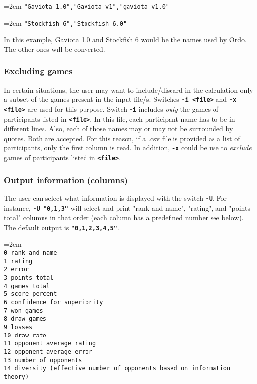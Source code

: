 \documentclass[12pt]{article}
\newcommand{\swtch} [1] {\texttt{\textbf{#1}}}
\newcommand{\cmdln}[1]{
	\par
	\begingroup
		\leftskip=2em
		\addtolength{\rightskip}{0em}
		\noindent \small{\texttt{#1}}
		\par
	\endgroup
}
\begin{document}
	\cmdln{"Gaviota 1.0","Gaviota v1","gaviota v1.0"}
	\cmdln{"Stockfish 6","Stockfish 6.0"}

In this example, Gaviota 1.0 and Stockfish 6 would be the names used by Ordo.
The other ones will be converted.

\subsubsection*{Excluding games}
In certain situations, the user may want to include/discard in the calculation only a subset of the games present in the input file/s.
Switches \swtch{-i <file>} and \swtch{-x <file>} are used for this purpose.
Switch \swtch{-i} includes \textit{only} the games of participants listed in \swtch{<file>}.
In this file, each participant name has to be in different lines. 
Also, each of those names may or may not be surrounded by quotes.
Both are accepted.
For this reason, if a .csv file is provided as a list of participants, only the first column is read.
In addition, \swtch{-x} could be use to \textit{exclude} games of participants listed in \swtch{<file>}.

\subsubsection*{Output information (columns)}
The user can select what information is displayed with the switch \swtch{-U}.
For instance, \swtch{-U "0,1,3"} will select and print "rank and name", "rating", and "points total" columns in that order (each column has a predefined number see below). 
The default output is \swtch{"0,1,2,3,4,5"}.

\cmdln{\\
 0 rank and name\\
 1 rating\\
 2 error\\
 3 points total\\
 4 games total\\
 5 score percent\\
 6 confidence for superiority\\
 7 won games\\
 8 draw games\\
 9 losses\\
10 draw rate\\
11 opponent average rating\\
12 opponent average error\\
13 number of opponents\\
14 diversity (effective number of opponents based on information theory)}
\end{document}
